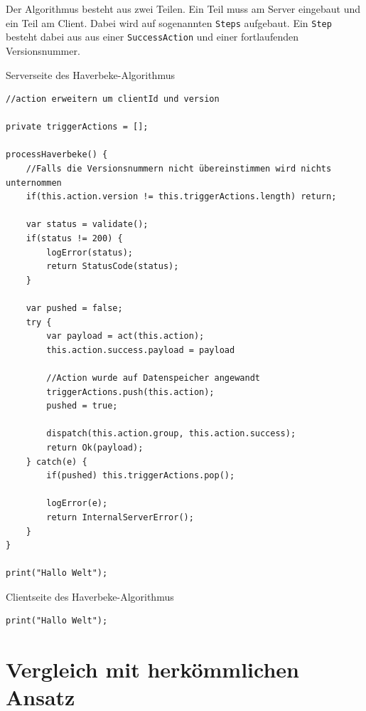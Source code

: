 \documentclass[12pt]{book}          %
\begin{document}
Der Algorithmus besteht aus zwei Teilen. Ein Teil muss am Server eingebaut und ein Teil am Client. Dabei wird auf sogenannten \texttt{Steps} aufgebaut. Ein \texttt{Step} besteht dabei aus aus einer \texttt{SuccessAction} und einer fortlaufenden Versionsnummer.


\begin{algorithm}
\caption{Serverseite des Haverbeke-Algorithmus}
\label{alg-hverbeke-server}
\begin{lstlisting}
//action erweitern um clientId und version

private triggerActions = [];

processHaverbeke() {
    //Falls die Versionsnummern nicht übereinstimmen wird nichts unternommen
    if(this.action.version != this.triggerActions.length) return;

    var status = validate();
    if(status != 200) {
        logError(status);
        return StatusCode(status);
    }

    var pushed = false;
    try {
        var payload = act(this.action);
        this.action.success.payload = payload
        
        //Action wurde auf Datenspeicher angewandt
        triggerActions.push(this.action);
        pushed = true;

        dispatch(this.action.group, this.action.success);
        return Ok(payload);
    } catch(e) {
        if(pushed) this.triggerActions.pop();
        
        logError(e);
        return InternalServerError();
    }
}

print("Hallo Welt");
\end{lstlisting}
\end{algorithm}


\begin{algorithm}
\caption{Clientseite des Haverbeke-Algorithmus}
\label{alg-hverbeke-client}
\begin{lstlisting}
print("Hallo Welt");
\end{lstlisting}
\end{algorithm}

\section{Vergleich mit herkömmlichen Ansatz}
\label{sec-yr-vergleich-mit-herkoemmlichen-ansatz}

\end{document}
